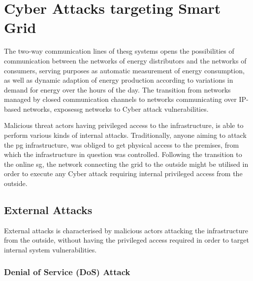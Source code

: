 \section{Cyber Attacks targeting Smart Grid}

The two-way communication lines of the\acrlong{sg} systems opens the possibilities of communication between the networks of energy distributors and the networks of consumers, serving purposes as automatic measurement of energy consumption, as well as dynamic adaption of energy production according to variations in demand for energy over the hours of the day.
The transition from networks managed by closed communication channels to networks communicating over IP-based networks, exposes\acrlong{sg} networks to Cyber attack vulnerabilities.



Malicious threat actors having privileged access to the infrastructure, is able to perform various kinds of internal attacks. Traditionally, anyone aiming to attack the \acrlong{pg} infrastructure, was obliged to get physical access to the premises, from which the infrastructure in question was controlled. Following the transition to the online \acrshort{sg}, the network connecting the grid to the outside might be utilised in order to execute any Cyber attack requiring internal privileged access from the outside.


\subsection{External Attacks}
External attacks is characterised by malicious actors attacking the infrastructure from the outside, without having the privileged access required in order to target internal system vulnerabilities.




\subsubsection{Denial of Service (DoS) Attack}


